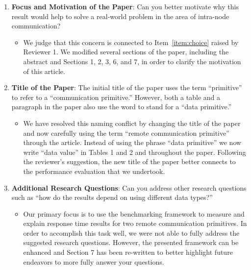 \documentclass[11pt]{article}
\begin{document}
\begin{enumerate}

  \item {\bf Focus and Motivation of the Paper}: Can you better
    motivate why this result would help to solve a real-world problem
    in the area of intra-node communication?

    \begin{itemize}

      \item We judge that this concern is connected to
        Item~\ref{item:choice} raised by Reviewer 1.  We modified
        several sections of the paper, including the abstract and
        Sections 1, 2, 3, 6, and 7, in order to clarify the motivation
        of this article.

    \end{itemize}

  \item {\bf Title of the Paper}: The initial title of the paper uses
    the term ``primitive'' to refer to a ``communication primitive.''
    However, both a table and a paragraph in the paper also use the
    word to stand for a ``data primitive.''

    \begin{itemize}

      \item We have resolved this naming conflict by changing the
        title of the paper and now carefully using the term ``remote
        communication primitive'' through the article.  Instead of
        using the phrase ``data primitive'' we now write ``data
        value'' in Tables 1 and 2 and throughout the paper.  Following
        the reviewer's suggestion, the new title of the paper better
        connects to the performance evaluation that we undertook.

    \end{itemize}

  \item {\bf Additional Research Questions}: Can you address other
    research questions such as ``how do the results depend on using
    different data types?''

    \begin{itemize}

      \item Our primary focus is to use the benchmarking framework to
        measure and explain response time results for two remote
        communication primitives.  In order to accomplish this task
        well, we were not able to fully address the suggested research
        questions.  However, the presented framework can be enhanced
        and Section 7 has been re-written to better highlight future
        endeavors to more fully answer your questions.


\end{itemize}
\end{enumerate}
\end{document}
